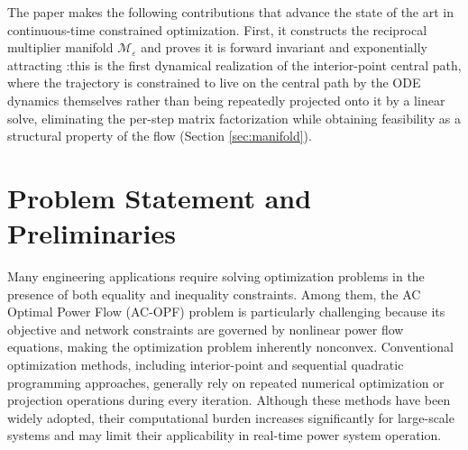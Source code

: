 \documentclass[11pt,onecolumn]{article}
\theoremstyle{definition}
\theoremstyle{remark}
\begin{document}

The paper makes the following contributions that advance the state of the art in continuous-time constrained optimization. First, it constructs the reciprocal multiplier manifold $\mathcal{M}_\varepsilon$ and proves it is forward invariant and exponentially attracting :this is the first dynamical realization of the interior-point central path, where the trajectory is constrained to live on the central path by the ODE dynamics themselves rather than being repeatedly projected onto it by a linear solve, eliminating the per-step matrix factorization while obtaining feasibility as a structural property of the flow (Section \ref{sec:manifold}). 

\section{Problem Statement and Preliminaries}

Many engineering applications require solving optimization problems in the presence of both equality and inequality constraints. Among them, the AC Optimal Power Flow (AC-OPF) problem is particularly challenging because its objective and network constraints are governed by nonlinear power flow equations, making the optimization problem inherently nonconvex. Conventional optimization methods, including interior-point and sequential quadratic programming approaches, generally rely on repeated numerical optimization or projection operations during every iteration. Although these methods have been widely adopted, their computational burden increases significantly for large-scale systems and may limit their applicability in real-time power system operation.
\end{document}
